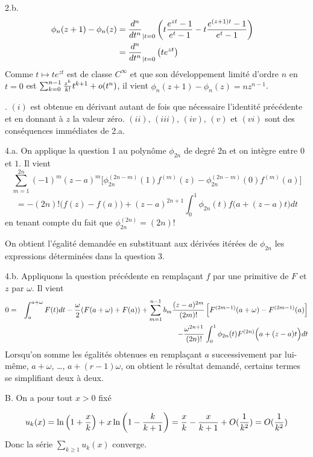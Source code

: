 {\begin{enumerate}
{\medskip
2.b. 
$$\begin{aligned}
\phi_n(z+1)-\phi_n(z)&={d^n \over dt^n}_{| t=0}
                      \left(t{e^{zt}-1 \over e^t-1} - t{e^{(z+1)t}-1 \over e^t-1} \right) \cr
                     &={d^n \over dt^n}_{| t=0} \left(t e^{zt} \right) \cr
\end{aligned}
$$
Comme $t \mapsto t e^{zt}$ est de classe $C^\infty$ et que son développement limité
d'ordre $n$ en $t=0$ est $\sum_{k=0}^{n-1} {z^k\over k!} t^{k+1} + o(t^n)$, il vient
$\phi_n(z+1)-\phi_n(z)=nz^{n-1}$.


. $(i)$ est obtenue en dérivant autant de fois que nécessaire l'identité précédente
et en donnant à $z$ la valeur zéro.
   $(ii)$, $(iii)$, $(iv)$, $(v)$ et $(vi)$ sont des conséquences immédiates de 2.a.

4.a. On applique la question 1 au polynôme $\phi_{2n}$ de degré 2n et on
intègre entre $0$ et $1$. Il vient
\[
\sum_{m=1}^{2n} (-1)^m (z-a)^m \Big[ \phi_{2n}^{(2n-m)}(1) f^{(m)}(z)
- \phi_{2n}^{(2n-m)}(0) f^{(m)}(a)  \Big]
\]\[
 = -(2n)! \bigl( f(z)-f(a) \bigr) + (z-a)^{2n+1} \int_0^1 \phi_{2n}(t)f\Big( a+(z-a)t \Big)dt
\]
en tenant compte du fait que $\phi_{2n}^{(2n)}=(2n)!$

On obtient l'égalité demandée en substituant aux  dérivées itérées
de $\phi_{2n}$ les expressions déterminées dans la question 3.      

\medskip
4.b. Appliquons la question précédente en remplaçant $f$ par une
primitive de $F$ et $z$ par $\omega$. Il vient
\begin{eqnarray*}
0 &=& \int_a^{a+\omega} F(t)dt - {\omega\over2} (F(a+\omega)+F(a)) 
+ \sum_{m=1}^{n-1} b_m {(z-a)^{2m} \over (2m)!} \left[ F^{(2m-1)}(a+\omega) - F^{(2m-1)}(a) \right] 
\\
&& - {\omega^{2n+1}\over (2n)!} \int_0^1 \phi_{2n}(t)F^{(2n)}\Big( a+(z-a)t \Big)dt  
 \end{eqnarray*}
Lorsqu'on somme les égalités obtenues en remplaçant $a$ successivement
par lui-m{\^e}me, $a+\omega$, \dots, $a+(r-1)\omega$, on obtient le résultat demandé,
certains termes se simplifiant deux à deux.

\bigskip
{\leftskip=-1cm B. On a pour tout $x>0$ fixé \par}
$$u_k(x)=\ln \left( 1+{x\over k} \right)
                        + x \ln \left( 1-{k\over k+1} \right)
                        ={x\over k}-{x\over k+1}+O({1\over k^2})
                        =O({1\over k^2})$$
Donc la série $\sum_{k\geq1}u_k(x)$ converge.

}
\end{enumerate}}
